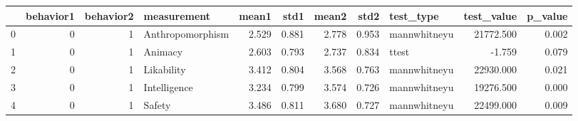 \begin{tabular}{lrrlrrrrlrr}
\toprule
{} &  behavior1 &  behavior2 &       measurement &  mean1 &   std1 &  mean2 &   std2 &     test\_type &  test\_value &  p\_value \\
\midrule
0 &          0 &          1 &  Anthropomorphism &  2.529 &  0.881 &  2.778 &  0.953 &  mannwhitneyu &   21772.500 &    0.002 \\
1 &          0 &          1 &           Animacy &  2.603 &  0.793 &  2.737 &  0.834 &         ttest &      -1.759 &    0.079 \\
2 &          0 &          1 &        Likability &  3.412 &  0.804 &  3.568 &  0.763 &  mannwhitneyu &   22930.000 &    0.021 \\
3 &          0 &          1 &      Intelligence &  3.234 &  0.799 &  3.574 &  0.726 &  mannwhitneyu &   19276.500 &    0.000 \\
4 &          0 &          1 &            Safety &  3.486 &  0.811 &  3.680 &  0.727 &  mannwhitneyu &   22499.000 &    0.009 \\
\bottomrule
\end{tabular}
